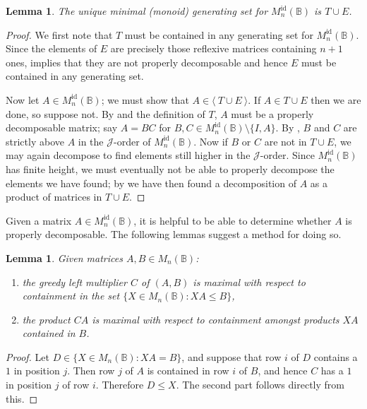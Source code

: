 \documentclass[11pt]{article}
\newtheorem{lemma}[thm]{Lemma}
\numberwithin{equation}{section}
\newcommand{\set}[2]{\ensuremath{\{#1 : #2 \}}}
\newcommand{\genset}[1]{\ensuremath{\langle\: #1 \:\rangle}}
\newcommand{\B}{\mathbb{B}}
\newcommand{\Bn}{M_n(\B)}
\newcommand{\Refn}{M_n^{\text{id}}(\B)}
\newcommand{\J}{\mathscr{J}}
\begin{document}
\begin{lemma}
  The unique minimal (monoid) generating set for $\Refn$ is $T \cup E$.
\end{lemma}
\begin{proof}
  We first note that $T$ must be contained in any generating set for $\Refn$.
  Since the elements of $E$ are precisely those reflexive matrices containing
  $n + 1$ ones,  implies that they are not
  properly decomposable and hence $E$ must be contained in any generating set.

  Now let $A \in \Refn$; we must show that $A \in \genset{T \cup E}$. If $A \in
  T \cup E$ then we are done, so suppose not. By
   and the definition of $T$, $A$ must be a
  properly decomposable matrix; say $A = BC$ for $B, C \in \Refn\setminus\{I,
  A\}$. By , $B$ and $C$ are strictly above $A$ in
  the $\J$-order of $\Refn$. Now if $B$ or $C$ are not in $T \cup E$, we may
  again decompose to find elements still higher in the $\J$-order. Since $\Refn$
  has finite height, we must eventually not be able to properly decompose the
  elements we have found; by  we have then
  found a decomposition of $A$ as a product of matrices in $T \cup E$.
\end{proof}

Given a matrix $A \in \Refn$, it is helpful to be able to determine whether $A$
is properly decomposable. The following lemmas suggest a method for doing so.

\begin{lemma}
  Given matrices $A, B \in \Bn$:
  \begin{enumerate}[label={\rm (\roman*)}]
    \item
      the greedy left multiplier $C$ of $(A, B)$ is maximal with respect to
      containment in the set $\set{X \in \Bn}{XA \leq B}$,
    \item 
      the product $CA$ is maximal with respect to containment amongst products
      $XA$ contained in $B$.
  \end{enumerate}
\end{lemma}
\begin{proof}
  Let $D \in \set{X \in \Bn}{XA = B}$, and suppose that row $i$ of $D$ contains
  a $1$ in position $j$. Then row $j$ of $A$ is contained in row $i$ of $B$, and
  hence $C$ has a $1$ in position $j$ of row $i$. Therefore $D \leq X$. The
  second part follows directly from this.
\end{proof}
\end{document}
